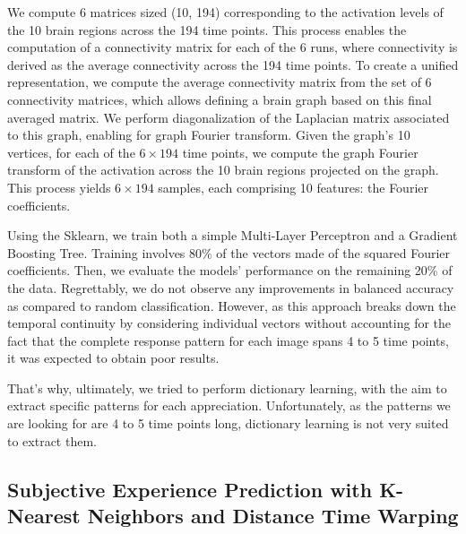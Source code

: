 We compute 6 matrices sized (10, 194) corresponding to the activation levels of the 10 brain regions across the 194 time points. This process enables the computation of a connectivity matrix for each of the 6 runs, where connectivity is derived as the average connectivity across the 194 time points. To create a unified representation, we compute the average connectivity matrix from the set of 6 connectivity matrices, which allows defining a brain graph based on this final averaged matrix. We perform diagonalization of the Laplacian matrix associated to this graph, enabling for graph Fourier transform. Given the graph's 10 vertices, for each of the $6\times194$ time points, we compute the graph Fourier transform of the activation across the 10 brain regions projected on the graph. This process yields $6\times194$ samples, each comprising 10 features: the Fourier coefficients.

Using the Sklearn, we train both a simple Multi-Layer Perceptron and a Gradient Boosting Tree. Training involves 80\% of the vectors made of the squared Fourier coefficients. Then, we evaluate the models' performance on the remaining 20\% of the data. Regrettably, we do not observe any improvements in balanced accuracy as compared to random classification. However, as this approach breaks down the temporal continuity by considering individual vectors without accounting for the fact that the complete response pattern for each image spans 4 to 5 time points, it was expected to obtain poor results.

That's why, ultimately, we tried to perform dictionary learning, with the aim to extract specific patterns for each appreciation. Unfortunately, as the patterns we are looking for are 4 to 5 time points long, dictionary learning is not very suited to extract them. 

\subsection{Subjective Experience Prediction with K-Nearest Neighbors and Distance Time Warping}

